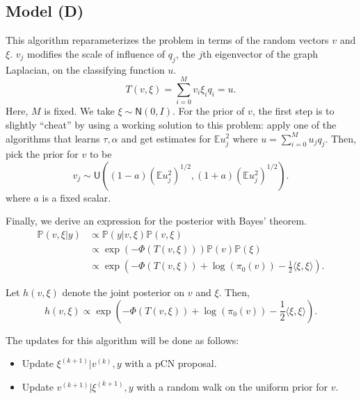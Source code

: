 \documentclass{siamart1116}
\begin{document}
    \subsection{Model (D)}
        This algorithm reparameterizes the problem in terms of the random vectors $v$ and $\xi$. $v_j$ modifies the scale of influence of $q_j$, the $j$th eigenvector of the graph Laplacian, on the classifying function $u$.
        \begin{equation}
        \label{eqn:v_T}
        T(v,\xi) = \sum_{i=0}^{M} v_i\xi_iq_i = u.
        \end{equation}
        Here, $M$ is fixed. We take $\xi \sim \mathsf{N}(0, I)$. For the prior of $v$, the first step is to slightly ``cheat'' by using a working solution to this problem: apply one of the algorithms that learns $\tau, \alpha$ and get estimates for $\mathbb{E} u_j^2$ where $u = \sum_{i=0}^M u_j q_j$. Then, pick the prior for $v$ to be
        \[v_j \sim \mathsf{U}\left((1-a)(\mathbb{E}u_j^2)^{1/2},(1+a)(\mathbb{E}u_j^2)^{1/2}\right).\]
        where $a$ is a fixed scalar.

        Finally, we derive an expression for the posterior with Bayes' theorem.
        \begin{align*}
        \mathbb{P}(v,\xi | y) &\propto \mathbb{P}(y|v, \xi) \mathbb{P}(v, \xi)\\
        &\propto \exp \left(-\Phi(T(v,\xi)) \right) \mathbb{P}(v)\mathbb{P}(\xi) \\
        &\propto \exp \left(-\Phi(T(v,\xi)) + \log (\pi_0(v)) - \frac{1}{2}\langle \xi, \xi \rangle  \right).
        \end{align*}

        Let $h(v,\xi)$ denote the joint posterior on $v$ and $\xi$. Then,
        \begin{equation}
        \label{eqn:learn_v_posterior}
        h(v, \xi) \propto \exp \left(-\Phi(T(v,\xi)) + \log (\pi_0(v)) - \frac{1}{2}\langle \xi, \xi \rangle  \right).
        \end{equation}

        The updates for this algorithm will be done as follows:

        \begin{itemize}
            \item Update $\xi^{(k+1)} | v^{(k)}, y$ with a pCN proposal.
            \item Update $v^{(k+1)} | \xi^{(k+1)}, y$ with a random walk on the uniform prior for $v$.
        \end{itemize}
\end{document}
